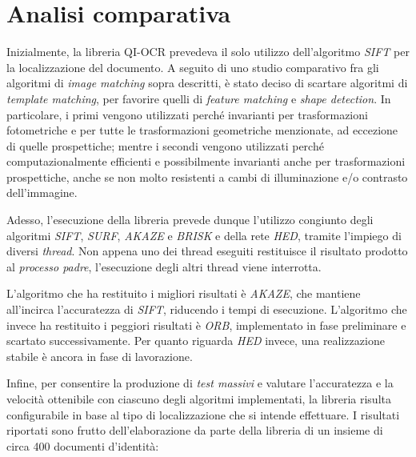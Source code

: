 \section{Analisi comparativa}
\label{sec:image-matching-comparison}
Inizialmente, la libreria QI-OCR prevedeva il solo utilizzo dell'algoritmo \textit{SIFT} per la localizzazione del documento. A seguito di uno studio comparativo fra gli algoritmi di \textit{image matching} sopra descritti, \`e stato deciso di scartare algoritmi di \textit{template matching}, per favorire quelli di \textit{feature matching} e \textit{shape detection}. In particolare, i primi vengono utilizzati perch\'e invarianti per trasformazioni fotometriche e per tutte le trasformazioni geometriche menzionate, ad eccezione di quelle prospettiche; mentre i secondi vengono utilizzati perch\'e computazionalmente efficienti e possibilmente invarianti anche per trasformazioni prospettiche, anche se non molto resistenti a cambi di illuminazione e/o contrasto dell'immagine.\par
Adesso, l'esecuzione della libreria prevede dunque l'utilizzo congiunto degli algoritmi \textit{SIFT}, \textit{SURF}, \textit{AKAZE} e \textit{BRISK} e della rete \textit{HED}, tramite l'impiego di diversi \textit{thread}. Non appena uno dei thread eseguiti restituisce il risultato prodotto al \textit{processo padre}, l'esecuzione degli altri thread viene interrotta.\par
\enlargethispage{4\baselineskip}
L'algoritmo che ha restituito i migliori risultati \`e \textit{AKAZE}, che mantiene all'incirca l'accuratezza di \textit{SIFT}, riducendo i tempi di esecuzione. L'algoritmo che invece ha restituito i peggiori risultati \`e \textit{ORB}, implementato in fase preliminare e scartato successivamente. Per quanto riguarda \textit{HED} invece, una realizzazione stabile \`e ancora in fase di lavorazione.\par
Infine, per consentire la produzione di \textit{test massivi} e valutare l'accuratezza e la velocit\`a ottenibile con ciascuno degli algoritmi implementati, la libreria risulta configurabile in base al tipo di localizzazione che si intende effettuare. I risultati riportati sono frutto dell'elaborazione da parte della libreria di un insieme di circa 400 documenti d'identit\`a: 
\begin{table}[H]
	\centering
	\caption{Analisi comparativa algoritmi di \textit{feature matching}}
	\label{tab:feature-matching-comparison}
\end{table}
